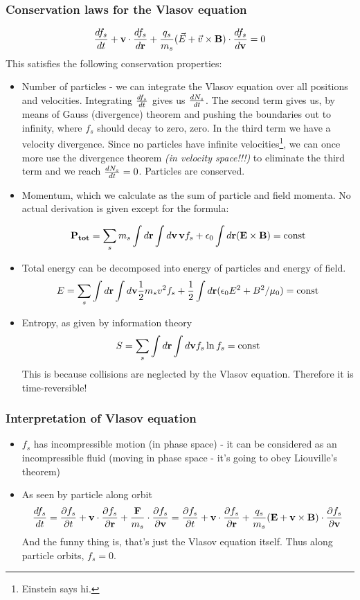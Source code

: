 \documentclass[PlasmaNotes.tex]{subfiles}
\begin{document}
\subsubsection{Conservation laws for the Vlasov equation}
\[\frac{d f_s}{d t} + \mathbf{v} \cdot \frac{d f_s}{d \mathbf{r}} + \frac{q_s}{m_s} (\vec{E} + \vec{v} \times \mathbf{B}) \cdot \frac{d f_s}{d \mathbf{v}} = 0\]
This satisfies the following conservation properties:
\begin{itemize}
\item Number of particles - we can integrate the Vlasov equation over all positions and velocities. Integrating $\frac{d f_s}{d t}$ gives us $\frac{d N_s}{d t}$. The second term gives us, by means of Gauss (divergence) theorem and pushing the boundaries out to infinity, where $f_s$ should decay to zero, zero. In the third term we have a velocity divergence. Since no particles have infinite velocities\footnote{Einstein says hi.}, we can once more use the divergence theorem \textit{(in velocity space!!!)} to eliminate the third term and we reach $\frac{d N_s}{d t} = 0$. Particles are conserved.
\item Momentum, which we calculate as the sum of particle and field momenta. No actual derivation is given except for the formula:

\[ \mathbf{P_{tot}} = \sum_s m_s \int d\mathbf{r} \int d\mathbf{v} \, \mathbf{v} f_s + \epsilon_0 \int d\mathbf{r} (\mathbf{E} \times \mathbf{B}) = \text{const}  \]

\item Total energy can be decomposed into energy of particles and energy of field.
\[ E= \sum_s \int d\mathbf{r} \int d\mathbf{v} \frac{1}{2} m_s v^2 f_s + \frac{1}{2} \int d\mathbf{r} (\epsilon_0 E^2 + B^2/\mu_0) = \text{const} \]

\item Entropy, as given by information theory
\[ S = \sum_s \int d\mathbf{r} \int d\mathbf{v} f_s \ln{f_s} = \text{const} \]
This is because collisions are neglected by the Vlasov equation. Therefore it is time-reversible!
\end{itemize}


\subsubsection{Interpretation of Vlasov equation}
\begin{itemize}
\item $f_s$ has incompressible motion (in phase space) - it can be considered as an incompressible fluid (moving in phase space - it's going to obey Liouville's theorem)
\item As seen by particle along orbit \[ \frac{d f_s}{d t} = \frac{\partial f_s}{\partial t} + \mathbf{v} \cdot \frac{\partial f_s}{\partial \mathbf{r}} + \frac{\mathbf{F}}{m_s} \cdot \frac{\partial f_s}{\partial \mathbf{v}} = \frac{\partial f_s}{\partial t} + \mathbf{v} \cdot \frac{\partial f_s}{\partial \mathbf{r}} + \frac{q_s}{m_s} (\mathbf{E} + \mathbf{v} \times \mathbf{B}) \cdot \frac{\partial f_s}{\partial \mathbf{v}} \]
And the funny thing is, that's just the Vlasov equation itself. Thus along particle orbits, $f_s = 0$.
\end{itemize}
\end{document}
